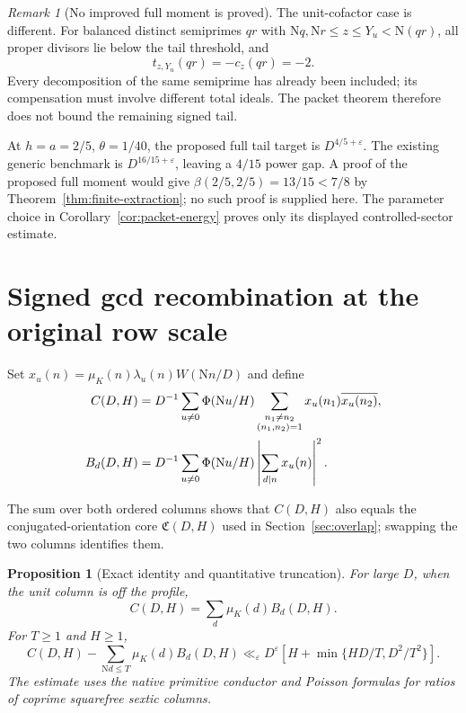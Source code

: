 \documentclass[11pt]{article}
\numberwithin{equation}{section}
\newtheorem{proposition}[theorem]{Proposition}
\theoremstyle{definition}
\theoremstyle{remark}
\newtheorem{remark}[theorem]{Remark}
\newcommand{\N}{\mathrm N}
\newcommand{\eps}{\varepsilon}
\begin{document}
\begin{remark}[No improved full moment is proved]
\label{rem:packet-open-moment}
The unit-cofactor case is different. For balanced distinct
semiprimes $qr$ with $\N q,\N r\le z\le Y_u<\N(qr)$,
all proper divisors lie below the tail threshold, and
\[
 t_{z,Y_u}(qr)=-c_z(qr)=-2.
\]
Every decomposition of the same semiprime has already been included;
its compensation must involve different total ideals. The packet
theorem therefore does not bound the remaining signed tail.

At $h=a=2/5$, $\theta=1/40$, the proposed full tail target is
$D^{4/5+\eps}$. The existing generic benchmark is
$D^{16/15+\eps}$, leaving a $4/15$ power gap. A proof of the
proposed full moment would give
$\beta(2/5,2/5)=13/15<7/8$ by
Theorem~\ref{thm:finite-extraction}; no such proof is supplied here.
The parameter choice in Corollary~\ref{cor:packet-energy} proves
only its displayed controlled-sector estimate.
\end{remark}

\section{Signed gcd recombination at the original row scale}
\label{sfac:sec:gcd}\label{sec:gcd}

Set $x_u(n)=\mu_K(n)\lambda_u(n)W(\N n/D)$ and define
\begin{align}
 C(D,H)&=D^{-1}\sum_{u\ne0}\Phi(\N u/H)
       \sum_{\substack{n_1\ne n_2\\(n_1,n_2)=1}}
          x_u(n_1)\overline{x_u(n_2)},\notag\\
 B_d(D,H)&=D^{-1}\sum_{u\ne0}\Phi(\N u/H)
              \left|\sum_{d\mid n}x_u(n)\right|^2.
 \label{sfac:eq:gcd-definitions}
\end{align}

The sum over both ordered columns shows that \(C(D,H)\) also equals
the conjugated-orientation core \(\mathfrak C(D,H)\) used in
Section~\ref{sec:overlap}; swapping the two columns identifies them.

\begin{proposition}[Exact identity and quantitative truncation]
\label{sfac:prop:gcd}
For large $D$, when the unit column is off the profile,
\begin{equation}
 C(D,H)=\sum_d\mu_K(d)B_d(D,H).
 \label{sfac:eq:gcd-exact}
\end{equation}
For $T\ge1$ and $H\ge1$,
\begin{equation}
 C(D,H)-\sum_{\N d\le T}\mu_K(d)B_d(D,H)
 \ll_\varepsilon D^\varepsilon
        \left[H+\min\{HD/T,D^2/T^2\}\right].
 \label{sfac:eq:gcd-tail}
\end{equation}
The estimate uses the native primitive conductor and Poisson formulas
for ratios of coprime squarefree sextic columns.
\end{proposition}
\end{document}
